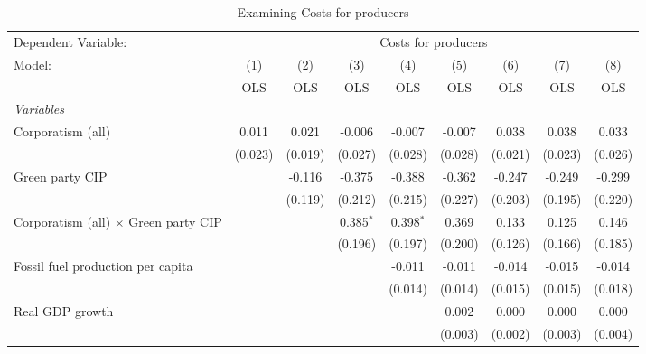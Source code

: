 
\begin{table}[htbp]
   \caption{Examining Costs for producers}
   \centering
   \begin{tabular}{lcccccccc}
      \toprule
      Dependent Variable: & \multicolumn{8}{c}{Costs for producers}\\
      Model:                                      & (1)     & (2)     & (3)         & (4)         & (5)     & (6)         & (7)     & (8)\\  
                                                  &  OLS    & OLS     & OLS         & OLS         & OLS     & OLS         & OLS     & OLS\\  
      \midrule
      \emph{Variables}\\
      Corporatism (all)                           & 0.011   & 0.021   & -0.006      & -0.007      & -0.007  & 0.038       & 0.038   & 0.033\\   
                                                  & (0.023) & (0.019) & (0.027)     & (0.028)     & (0.028) & (0.021)     & (0.023) & (0.026)\\   
      Green party CIP                             &         & -0.116  & -0.375      & -0.388      & -0.362  & -0.247      & -0.249  & -0.299\\   
                                                  &         & (0.119) & (0.212)     & (0.215)     & (0.227) & (0.203)     & (0.195) & (0.220)\\   
      Corporatism (all) $\times$ Green party CIP  &         &         & 0.385$^{*}$ & 0.398$^{*}$ & 0.369   & 0.133       & 0.125   & 0.146\\   
                                                  &         &         & (0.196)     & (0.197)     & (0.200) & (0.126)     & (0.166) & (0.185)\\   
      Fossil fuel production per capita           &         &         &             & -0.011      & -0.011  & -0.014      & -0.015  & -0.014\\   
                                                  &         &         &             & (0.014)     & (0.014) & (0.015)     & (0.015) & (0.018)\\   
      Real GDP growth                             &         &         &             &             & 0.002   & 0.000       & 0.000   & 0.000\\   
                                                  &         &         &             &             & (0.003) & (0.002)     & (0.003) & (0.004)\\   

\end{tabular}
\end{table}
